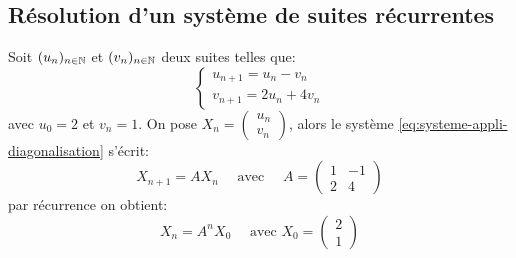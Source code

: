 \subsection{Résolution d'un système de suites récurrentes}
Soit $(u_n)_{n \in \mathbb{N}}$ et $(v_n)_{n \in \mathbb{N}}$ deux suites telles que:
\begin{equation}\label{eq:systeme-appli-diagonalisation}
    \begin{cases}
        u_{n+1} = u_n - v_n\\
        v_{n+1} = 2u_n + 4v_n
    \end{cases}
\end{equation}
avec $u_0 = 2$ et $v_n = 1$. On pose $X_n = \begin{pmatrix} u_n \\ v_n \end{pmatrix} $, alors le système \ref{eq:systeme-appli-diagonalisation} s'écrit:
\[
    X_{n+1} = AX_n \quad \text{ avec } \quad A = \begin{pmatrix} 1 & -1\\ 2 & 4 \end{pmatrix} 
\] 
par récurrence on obtient:
\[
X_n = A^nX_0 \quad \text{ avec } X_0 = \begin{pmatrix} 2 \\ 1 \end{pmatrix} 
\] 

